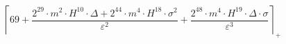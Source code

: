 \[\left\lceil 69 + \frac{2^{29} \cdot m^{2} \cdot H^{10} \cdot \Delta + 2^{44} \cdot m^{4} \cdot H^{18} \cdot \sigma^{2}}{\varepsilon^{2}} + \frac{2^{48} \cdot m^{4} \cdot H^{19} \cdot \Delta \cdot \sigma}{\varepsilon^{3}} \right\rceil_{+}\]
